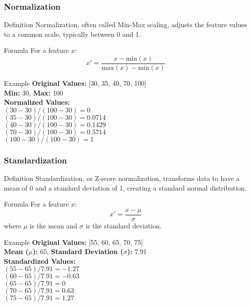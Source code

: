 \documentclass[aspectratio=169]{beamer}
\begin{document}
\begin{frame}[fragile]
    \frametitle{Normalization}
    \begin{block}{Definition}
        Normalization, often called Min-Max scaling, adjusts the feature values to a common scale, typically between 0 and 1.
    \end{block}

    \begin{block}{Formula}
        For a feature \( x \):
        \[
        x' = \frac{x - \text{min}(x)}{\text{max}(x) - \text{min}(x)}
        \]
    \end{block}

    \begin{block}{Example}
        \textbf{Original Values:} [30, 35, 40, 70, 100] \\
        \textbf{Min:} 30, \textbf{Max:} 100 \\
        \textbf{Normalized Values:} \\
        \( (30 - 30) / (100 - 30) = 0 \) \\
        \( (35 - 30) / (100 - 30) = 0.0714 \) \\
        \( (40 - 30) / (100 - 30) = 0.1429 \) \\
        \( (70 - 30) / (100 - 30) = 0.5714 \) \\
        \( (100 - 30) / (100 - 30) = 1 \)
    \end{block}
\end{frame}

\begin{frame}[fragile]
    \frametitle{Standardization}
    \begin{block}{Definition}
        Standardization, or Z-score normalization, transforms data to have a mean of 0 and a standard deviation of 1, creating a standard normal distribution.
    \end{block}

    \begin{block}{Formula}
        For a feature \( x \):
        \[
        x' = \frac{x - \mu}{\sigma}
        \]
        where \( \mu \) is the mean and \( \sigma \) is the standard deviation.
    \end{block}

    \begin{block}{Example}
        \textbf{Original Values:} [55, 60, 65, 70, 75] \\
        \textbf{Mean (\( \mu \)):} 65, \textbf{Standard Deviation (\( \sigma \)):} 7.91 \\
        \textbf{Standardized Values:} \\
        \( (55 - 65) / 7.91 = -1.27 \) \\
        \( (60 - 65) / 7.91 = -0.63 \) \\
        \( (65 - 65) / 7.91 = 0 \) \\
        \( (70 - 65) / 7.91 = 0.63 \) \\
        \( (75 - 65) / 7.91 = 1.27 \)
    \end{block}
\end{frame}
\end{document}
